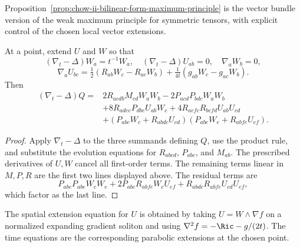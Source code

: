 \begin{remark}
\label{rem:chow-ii-bilinear-form-maximum-principle-comparison}
Proposition~\ref{prop:chow-ii-bilinear-form-maximum-principle} is the vector
bundle version of the weak maximum principle for symmetric tensors, with
explicit control of the chosen local vector extensions.
\end{remark}

\begin{theorem}
\label{thm:chow-ii-harnack-quadratic-evolution}
At a point, extend \(U\) and \(W\) so that
\[
(\nabla_t-\Delta)W_a=t^{-1}W_a,\quad
(\nabla_t-\Delta)U_{ab}=0,\quad \nabla_aW_b=0,
\]
\[
\nabla_aU_{bc}=\tfrac12(R_{ab}W_c-R_{ac}W_b)
+\tfrac1{4t}(g_{ab}W_c-g_{ac}W_b).
\]
Then
\[
\begin{aligned}
(\nabla_t-\Delta)Q={}&2R_{acdb}M_{cd}W_aW_b-2P_{acd}P_{bdc}W_aW_b\\
&+8R_{adec}P_{dbe}U_{ab}W_c+4R_{aefc}R_{befd}U_{ab}U_{cd}\\
&+(P_{abc}W_c+R_{abdc}U_{cd})
(P_{abe}W_e+R_{abfe}U_{ef}).
\end{aligned}
\]
\end{theorem}
\begin{proof}
\sketch Apply \(\nabla_t-\Delta\) to the three summands defining \(Q\), use the
product rule, and substitute the evolution equations for \(R_{abcd}\),
\(P_{abc}\), and \(M_{ab}\).  The prescribed derivatives of \(U,W\) cancel
all first-order terms.  The remaining terms linear in \(M,P,R\) are the first
two lines displayed above.  The residual terms are
\[
P_{abc}P_{abe}W_cW_e+2P_{abc}R_{abfe}W_cU_{ef}
+R_{abdc}R_{abfe}U_{cd}U_{ef},
\]
which factor as the last line.
\end{proof}

\begin{remark}
\label{rem:chow-ii-harnack-extension-soliton-motivation}
The spatial extension equation for \(U\) is obtained by taking
\(U=W\wedge\nabla f\) on a normalized expanding gradient soliton and using
\(\nabla^2f=-\Ric-g/(2t)\).  The time equations are the corresponding
parabolic extensions at the chosen point.
\end{remark}

